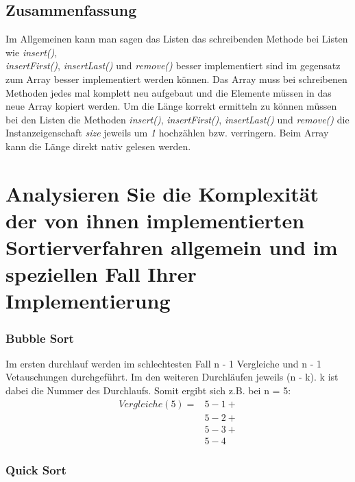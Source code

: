 \documentclass[a4paper, 11pt]{article}
\begin{document}
\subsection*{Zusammenfassung}
Im Allgemeinen kann man sagen das Listen das schreibenden Methode bei Listen wie \textit{insert()}, \\
\textit{insertFirst()}, \textit{insertLast()} und \textit{remove()} besser implementiert sind im gegensatz zum Array
besser implementiert werden können. Das Array muss bei schreibenen Methoden jedes mal komplett neu aufgebaut und die
Elemente müssen in das neue Array kopiert werden. Um die Länge korrekt ermitteln zu können müssen bei den Listen die
Methoden \textit{insert()}, \textit{insertFirst()}, \textit{insertLast()} und \textit{remove()}  die Instanzeigenschaft
\textit{size} jeweils um \textit{1} hochzählen bzw. verringern. Beim Array kann die Länge direkt nativ gelesen werden.

\section*{Analysieren Sie die Komplexität der von ihnen implementierten Sortierverfahren
          allgemein und im speziellen Fall Ihrer Implementierung}

\subsubsection*{Bubble Sort}

Im ersten durchlauf werden im schlechtesten Fall n - 1 Vergleiche und n - 1 Vetauschungen durchgeführt.
Im den weiteren Durchläufen jeweils (n - k). k ist dabei die Nummer des Durchlaufs. Somit ergibt sich z.B. bei n = 5: \\

\begin{equation*}
\begin{split}
Vergleiche(5) = & 5 - 1 + \\
                & 5 - 2 + \\
                & 5 - 3 + \\
                & 5 - 4
\end{split}
\end{equation*}


\subsubsection*{Quick Sort}
\end{document}
